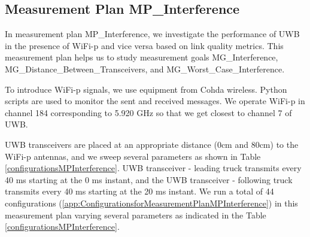 \subsection{Measurement Plan MP\_Interference}
In measurement plan MP\_Interference, we investigate the performance of UWB in the presence of WiFi-p and vice versa based on link quality metrics. This measurement plan helps us to study measurement goals MG\_Interference, MG\_Distance\_Between\_Transceivers, and MG\_Worst\_Case\_Interference.

To introduce WiFi-p signals, we use equipment from Cohda wireless. Python scripts are used to monitor the sent and received messages. We operate WiFi-p in channel 184 corresponding to 5.920 GHz so that we get closest to channel 7 of UWB.

UWB transceivers are placed at an appropriate distance (0cm and 80cm) to the WiFi-p antennas, and we sweep several parameters as shown in Table \ref{configurationsMPInterference}. UWB transceiver - leading truck transmits every 40 ms starting at the 0 ms instant, and the UWB transceiver - following truck transmits every 40 ms starting at the 20 ms instant. We run a total of 44 configurations (\ref{app:ConfigurationsforMeasurementPlanMPInterference}) in this measurement plan varying several parameters as indicated in the Table \ref{configurationsMPInterference}.
